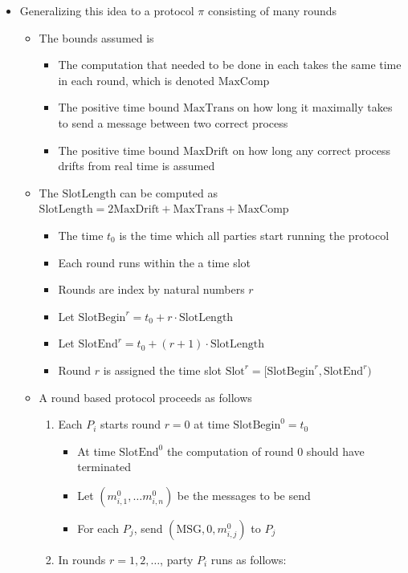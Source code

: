 \documentclass[11pt]{article}
\begin{document}
\begin{itemize}
\item Generalizing this idea to a protocol \(\pi\) consisting of many rounds
\begin{itemize}
\item The bounds assumed is
\begin{itemize}
\item The computation that needed to be done in each takes the same time in each round, which is denoted \(\text{MaxComp}\)
\item The positive time bound \(\text{MaxTrans}\) on how long it maximally takes to send a message between two correct process
\item The positive time bound \(\text{MaxDrift}\) on how long any correct process drifts from real time is assumed
\end{itemize}
\item The \(\text{SlotLength}\) can be computed as \(\text{SlotLength}=2\text{MaxDrift} + \text{MaxTrans} + \text{MaxComp}\)
\begin{itemize}
\item The time \(t_0\) is the time which all parties start running the protocol
\item Each round runs within the a time slot
\item Rounds are index by natural numbers \(r\)
\item Let \(\text{SlotBegin}^r = t_0 + r \cdot \text{SlotLength}\)
\item Let \(\text{SlotEnd}^r=t_0+(r+1) \cdot \text{SlotLength}\)
\item Round \(r\) is assigned the time slot \(\text{Slot}^r = [ \text{SlotBegin}^r, \text{SlotEnd}^r )\)
\end{itemize}
\item A round based protocol proceeds as follows
\begin{enumerate}
\item Each \(P_i\) starts round \(r=0\) at time \(\text{SlotBegin}^0 = t_0\) 
\begin{itemize}
\item At time \(\text{SlotEnd}^0\) the computation of round \(0\) should have terminated
\item Let \((m_{i,1}^0, \dots m_{i,n}^0)\) be the messages to be send
\item For each \(P_j\), send \(( \text{MSG}, 0, m_{i,j}^0)\) to \(P_j\)
\end{itemize}
\item In rounds \(r=1,2,\dots\), party \(P_i\) runs as follows:
\begin{enumerate}

\end{enumerate}
\end{enumerate}
\end{itemize}
\end{itemize}
\end{document}
